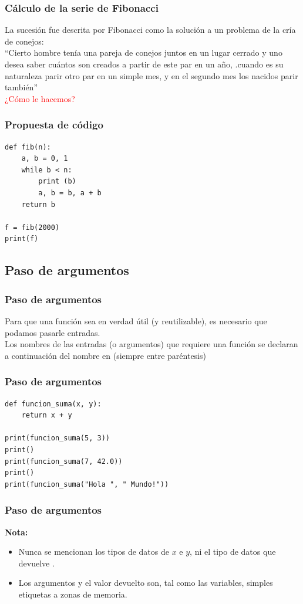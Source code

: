 \documentclass[12pt]{beamer}
\begin{document}
\begin{frame}
\frametitle{Cálculo de la serie de Fibonacci}
La sucesión fue descrita por Fibonacci como la solución a un problema de la cría de conejos: 
\\
\bigskip
\enquote{Cierto hombre tenía una pareja de conejos juntos en un lugar cerrado y uno desea saber cuántos son creados a partir de este par en un año, .cuando es su naturaleza parir otro par en un simple mes, y en el segundo mes los nacidos parir también}
\\
\bigskip
\pause
\textcolor{red}{¿Cómo le hacemos?}
\end{frame}
\begin{frame}[fragile]
\frametitle{Propuesta de código}
\begin{lstlisting}[caption=Primer intento para la serie de Fibonacci, basicstyle=\linespread{1.2}\ttfamily\small, columns=fullflexible,escapeinside=||]
def fib(n):
    a, b = 0, 1
    while b < n:
        print (b)
        a, b = b, a + b
    return b

f = fib(2000)
print(f)
\end{lstlisting}
\pause
\end{frame}

\subsection{Paso de argumentos}

\begin{frame}[fragile]
\frametitle{Paso de argumentos}
Para que una función sea en verdad útil (y reutilizable), es necesario que podamos pasarle entradas. 
\\
\bigskip
Los nombres de las entradas (o argumentos) que requiere una función se declaran a continuación del nombre en  (siempre entre paréntesis)
\end{frame}
\begin{frame}[fragile]
\frametitle{Paso de argumentos}
\begin{lstlisting}[caption=Paso de argumentos en una función, basicstyle=\linespread{1.2}\ttfamily\small, columns=fullflexible,escapeinside=||]
def funcion_suma(x, y):
    return x + y

print(funcion_suma(5, 3))
print()
print(funcion_suma(7, 42.0))
print()
print(funcion_suma("Hola ", " Mundo!"))
\end{lstlisting}
\end{frame}
\begin{frame}[fragile]
\frametitle{Paso de argumentos}
\textbf{Nota:} 
\begin{itemize}[<+->]
\item[\ding{212}] Nunca se mencionan los tipos de datos de $x$ e $y$, ni el tipo de datos que devuelve .
\item[\ding{212}] Los argumentos y el valor devuelto son, tal como las variables, simples etiquetas a zonas de memoria.
\end{itemize}  
\end{frame}
\end{document}
